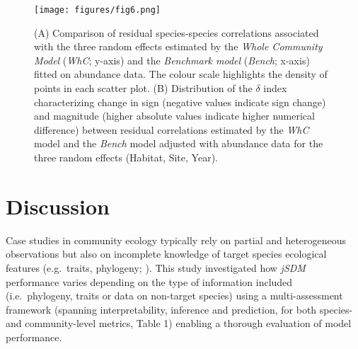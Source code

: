 \documentclass[9pt,biorxiv,doublespacing,lineno]{lapreprint}
\begin{document}
\begin{figure}
\hypertarget{fig:chapt1fig6}{%
\centering
\texttt{[image: figures/fig6.png]}
\caption{(A) Comparison of residual species-species correlations
associated with the three random effects estimated by the \emph{Whole
Community Model} (\emph{WhC}; y-axis) and the \emph{Benchmark model}
(\emph{Bench}; x-axis) fitted on abundance data. The colour scale
highlights the density of points in each scatter plot. (B) Distribution
of the \(\delta\) index characterizing change in sign (negative values
indicate sign change) and magnitude (higher absolute values indicate
higher numerical difference) between residual correlations estimated by
the \emph{WhC} model and the \emph{Bench} model adjusted with abundance
data for the three random effects (Habitat, Site,
Year).}\label{fig:chapt1fig6}
}
\end{figure}

\hypertarget{discussion}{%
\section{Discussion}\label{discussion}}

Case studies in community ecology typically rely on partial and
heterogeneous observations \autocite{Pollock_2020} but also on
incomplete knowledge of target species ecological features (e.g.~traits,
phylogeny; \textcite{Tyler_2012}). This study investigated how
\emph{jSDM} performance varies depending on the type of information
included (i.e.~phylogeny, traits or data on non-target species) using a
multi-assessment framework (spanning interpretability, inference and
prediction, for both species- and community-level metrics, Table 1)
enabling a thorough evaluation of model performance.
\end{document}
